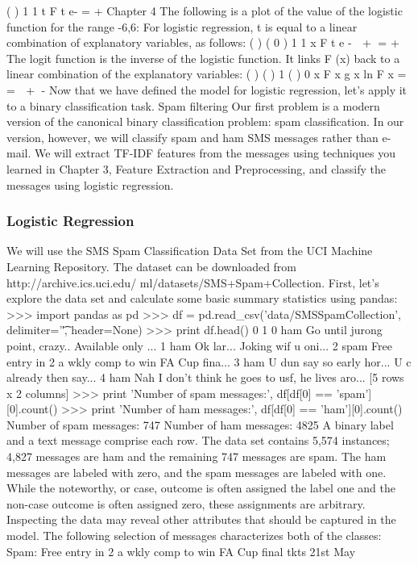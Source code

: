 \begin{frame}
( ) 1
1 t F t
e- =
+
Chapter 4
The following is a plot of the value of the logistic function for the range {-6,6}:
For logistic regression, t is equal to a linear combination of explanatory variables,
as follows:
( ) ( 0 )
1
1 x
F t
e -  + =
+
The logit function is the inverse of the logistic function. It links F (x) back to a linear
combination of the explanatory variables:
( ) ( )
1 ( ) 0 x
F x
g x ln
F x
= =  +
-
Now that we have defined the model for logistic regression, let's apply it to a binary
classification task.
Spam filtering
Our first problem is a modern version of the canonical binary classification problem:
spam classification. In our version, however, we will classify spam and ham SMS
messages rather than e-mail. We will extract TF-IDF features from the messages using
techniques you learned in Chapter 3, Feature Extraction and Preprocessing, and classify
the messages using logistic regression.
\begin{frame}\frametitle{Logistic Regression}
We will use the SMS Spam Classification Data Set from the UCI Machine Learning
Repository. The dataset can be downloaded from http://archive.ics.uci.edu/
ml/datasets/SMS+Spam+Collection. First, let's explore the data set and calculate
some basic summary statistics using pandas:
>>> import pandas as pd
>>> df = pd.read_csv('data/SMSSpamCollection', delimiter='\t',
header=None)
>>> print df.head()
0 1
0 ham Go until jurong point, crazy.. Available only ...
1 ham Ok lar... Joking wif u oni...
2 spam Free entry in 2 a wkly comp to win FA Cup fina...
3 ham U dun say so early hor... U c already then say...
4 ham Nah I don't think he goes to usf, he lives aro...
[5 rows x 2 columns]
>>> print 'Number of spam messages:', df[df[0] == 'spam'][0].count()
>>> print 'Number of ham messages:', df[df[0] == 'ham'][0].count()
Number of spam messages: 747
Number of ham messages: 4825
A binary label and a text message comprise each row. The data set contains 5,574
instances; 4,827 messages are ham and the remaining 747 messages are spam. The
ham messages are labeled with zero, and the spam messages are labeled with one.
While the noteworthy, or case, outcome is often assigned the label one and the
non-case outcome is often assigned zero, these assignments are arbitrary. Inspecting
the data may reveal other attributes that should be captured in the model. The
following selection of messages characterizes both of the classes:
Spam: Free entry in 2 a wkly comp to win FA Cup final tkts 21st May

\end{frame}
\end{frame}
